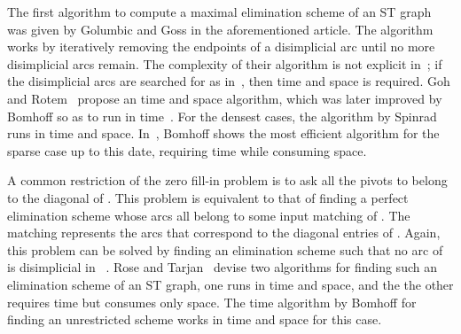 \documentclass[a4paper,11pt]{article}
\begin{document}
The first algorithm to compute a maximal elimination scheme of an ST graph was given by Golumbic and Goss in the aforementioned article.  The algorithm works by iteratively removing the endpoints of a disimplicial arc until no more disimplicial arcs remain.  The complexity of their algorithm is not explicit in~\cite{GolumbicGossJGT1978}; if the disimplicial arcs are searched for as in~\cite{BomhoffMantheyDAM2013}, then  time and  space is required.  Goh and Rotem~\cite{GohRotemIPL1982} propose an  time and  space algorithm, which was later improved by Bomhoff so as to run in  time~\cite{Bomhoff2011}.  For the densest cases, the algorithm by Spinrad~\cite{SpinradDAM2004} runs in  time and  space.  In~\cite{Bomhoff2011}, Bomhoff shows the most efficient algorithm for the sparse case up to this date, requiring  time while consuming  space.

A common restriction of the zero fill-in problem is to ask all the pivots to belong to the diagonal of .  This problem is equivalent to that of finding a perfect elimination scheme whose arcs all belong to some input matching  of .  The matching  represents the arcs that correspond to the diagonal entries of .  Again, this problem can be solved by finding an elimination scheme  such that no arc of  is disimplicial in ~\cite{GolumbicGossJGT1978}.  Rose and Tarjan~\cite{RoseTarjanSJAM1978} devise two algorithms for finding such an elimination scheme of an ST graph, one runs in  time and space, and the the other requires  time but consumes only  space.  The  time algorithm by Bomhoff for finding an unrestricted scheme works in  time and  space for this case.
\end{document}
